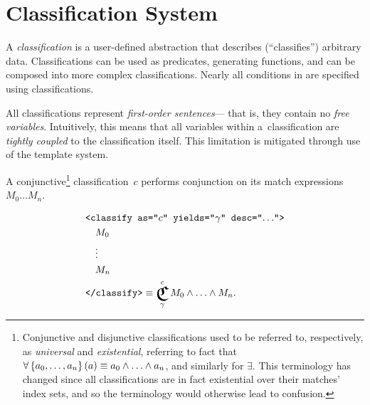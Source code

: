 
\section{Classification System}
A \emph{classification} is a user-defined abstraction that describes
  (``classifies'') arbitrary data.
Classifications can be used as predicates, generating functions, and can be
  composed into more complex classifications.
Nearly all conditions in \tame{} are specified using classifications.

All classifications represent \emph{first-order sentences}---%
  that is,
    they contain no \emph{free variables}.
Intuitively,
  this means that all variables within a~classification are
  \emph{tightly coupled} to the classification itself.
This limitation is mitigated through use of the template system.

\begin{definition}
  A conjunctive\footnote{%
    Conjunctive and disjunctive classifications used to be referred to,
      respectively,
      as \emph{universal} and \emph{existential},
        referring to fact that
          $\forall\left\{a_0,\ldots,a_n\right\}(a) \equiv a_0\wedge\ldots\wedge a_n$,
            and similarly for $\exists$.
    This terminology has changed since all classifications are in fact
      existential over their matches' index sets,
        and so the terminology would otherwise lead to confusion.
    }
    classification~$c$ performs conjunction on its match expressions
      $M_0\ldots M_n$.

  \begin{align*}
    &\xml{<classify as="$c$" yields="$\gamma$" desc="$\ldots$">} \\
    &\quad M_0 \\
    &\quad \vdots \\
    &\quad M_n \\
    &\xml{</classify>}
      \equiv \Classify^c_\gamma M_0 \logand \ldots \logand M_n.
  \end{align*}
\end{definition}

